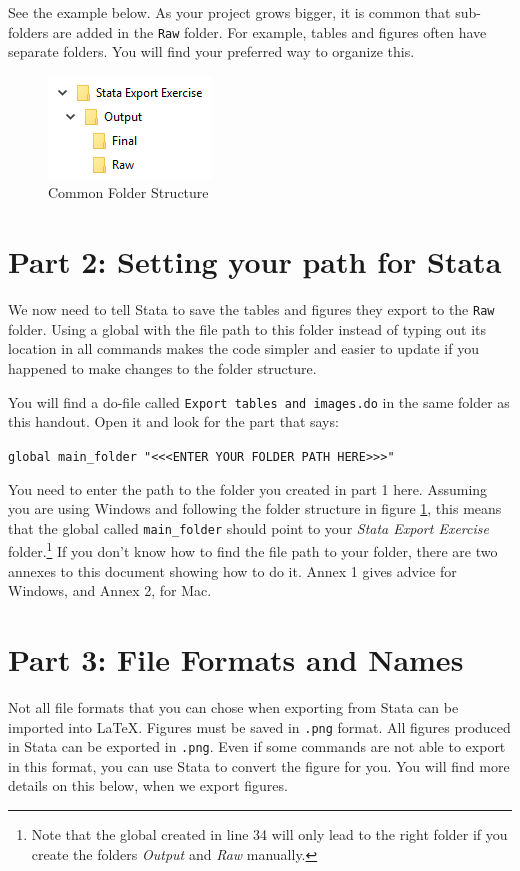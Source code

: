 \documentclass[]{article}
\begin{document}
See the example below. As your project grows bigger, it is common that sub-folders are added in the \texttt{Raw} folder. For example, tables and figures often have separate folders. You will find your preferred way to organize this.

\begin{figure}[H]
	\centering
	\includegraphics[width=0.3\linewidth]{img/outputRawFolders}
	\caption{Common Folder Structure}
	\label{fig:folder_structure}
\end{figure} 


\section*{Part 2: Setting your path for Stata}
We now need to tell Stata to save the tables and figures they export to the \texttt{Raw} folder. Using a global with the file path to this folder instead of typing out its location in all commands makes the code simpler and easier to update if you happened to make changes to the folder structure.

You will find a do-file called \texttt{Export tables and images.do} in the same folder as this handout. Open it and look for the part that says:
\begin{center}
	\verb|global main_folder "<<<ENTER YOUR FOLDER PATH HERE>>>"|
\end{center}

You need to enter the path to the folder you created in part 1 here. Assuming you are using Windows and following the folder structure in figure \ref{fig:folder_structure}, this means that the global called \verb|main_folder| should point to your \emph{Stata Export Exercise} folder.\footnote{Note that the global created in line 34 will only lead to the right folder if you create the folders \emph{Output} and \emph{Raw} manually.} If you don't know how to find the file path to your folder, there are two annexes to this document showing how to do it. Annex 1 gives advice for Windows, and Annex 2, for Mac.

\section*{Part 3: File Formats and Names}
Not all file formats that you can chose when exporting from Stata can be imported into {\LaTeX}. Figures must be saved in \texttt{.png} format. All figures produced in Stata can be exported in \texttt{.png}. Even if some commands are not able to export in this format, you can use Stata to convert the figure for you. You will find more details on this below, when we export figures. 
\end{document}
